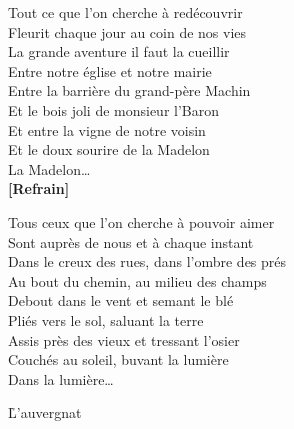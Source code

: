 \documentclass{novel}
\begin{document}
\setlength{\leftskip}{0pt}
\begin{multicols}{2}
Tout ce que l'on cherche à redécouvrir \\
Fleurit chaque jour au coin de nos vies \\
La grande aventure il faut la cueillir \\
Entre notre église et notre mairie \\
Entre la barrière du grand-père Machin \\
Et le bois joli de monsieur l'Baron \\
Et entre la vigne de notre voisin \\
Et le doux sourire de la Madelon \\
La Madelon… \\

\textbf{[Refrain]}\\

\columnbreak

Tous ceux que l'on cherche à pouvoir aimer \\
Sont auprès de nous et à chaque instant \\
Dans le creux des rues, dans l'ombre des prés \\
Au bout du chemin, au milieu des champs \\
Debout dans le vent et semant le blé \\
Pliés vers le sol, saluant la terre \\
Assis près des vieux et tressant l'osier \\
Couchés au soleil, buvant la lumière \\
Dans la lumière…
\end{multicols}

\newpage
\normalsize
\h*{L’auvergnat}
\end{document}
